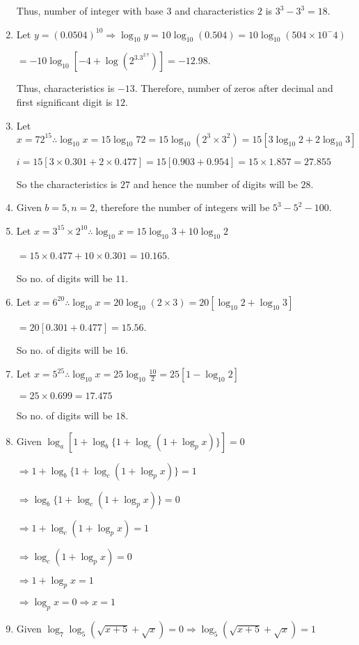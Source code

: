 \begin{enumerate}
  Thus, number of integer with base $3$ and characteristics $2$ is $3^3 - 3^3 = 18$.
\item Let $y = (0.0504)^{10} \Rightarrow \log_{10}y = 10\log_{10}(0.504) = 10\log_{10}(504\times10^-4)$

  $= -10\log_{10}[-4 + \log(2^3.3^2.7)] = -12.98$.

  Thus, characteristics is $-13$. Therefore, number of zeros after decimal and first significant digit is $12$.
\item Let $x = 72^{15} \therefore \log_{10}x = 15\log_{10}72 = 15\log_{10}(2^3\times3^2) = 15[3\log_{10}2 + 2\log_{10}3]$

  $i = 15[3\times0.301 + 2\times0.477] = 15[0.903 + 0.954] = 15\times1.857 = 27.855$

  So the characteristics is $27$ and hence the number of digits will be $28$.
\item Given $b = 5, n = 2$, therefore the number of integers will be $5^3 - 5^2 - 100$.
\item Let $x = 3^{15}\times 2^{10} \therefore \log_{10}x = 15\log_{10}3 + 10\log_{10}2$

  $= 15\times0.477 + 10\times 0.301 = 10.165$.

  So no. of digits will be $11$.
\item Let $x = 6^{20} \therefore \log_{10}x = 20\log_{10}(2\times3) = 20[\log_{10}2 + \log_{10}3]$

  $= 20[0.301 + 0.477] = 15.56$.

  So no. of digits will be $16$.
\item Let $x = 5^{25} \therefore \log_{10}x = 25\log_{10}\frac{10}{2}= 25[1 - \log_{10}2]$

  $= 25\times 0.699 = 17.475$

  So no. of digits will be $18$.
\item Given $\log_a[1 + \log_b\{1 + \log_c(1 + \log_px)\}] = 0$

  $\Rightarrow 1 + \log_b\{1 + \log_c(1 + \log_px)\} = 1$

  $\Rightarrow \log_b\{1 + \log_c(1 + \log_px)\} = 0$

  $\Rightarrow 1 + \log_c(1 + \log_px) = 1$

  $\Rightarrow \log_c(1 + \log_px) = 0$

  $\Rightarrow 1 + \log_px = 1$

  $\Rightarrow \log_px = 0 \Rightarrow x = 1$
\item Given $\log_7\log_5(\sqrt{x + 5} + \sqrt{x}) = 0 \Rightarrow \log_5(\sqrt{x + 5} + \sqrt{x}) = 1$


\end{enumerate}
